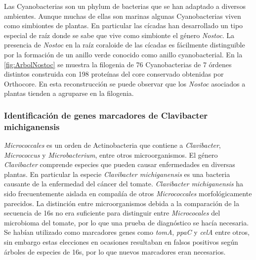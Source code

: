 \documentclass[]{article}
\begin{document}
Las Cyanobacterias son un phylum de bacterias que se han adaptado a
diversos ambientes. Aunque muchas de ellas son marinas algunas
Cyanobacterias viven como simbiontes de plantas. En particular las
cícadas han desarrollado un tipo especial de raíz donde se sabe que vive
como simbionte el género \emph{Nostoc}. La presencia de \emph{Nostoc} en
la raíz coraloide de las cícadas es fácilmente distinguible por la
formación de un anillo verde conocido como anillo cyanobacterial. En la
\autoref{fig:ArbolNostoc} se muestra la filogenia de 76 Cyanobacterias
de 7 órdenes distintos construida con 198 proteínas del core conservado
obtenidas por Orthocore. En esta reconstrucción se puede observar que
los \emph{Nostoc} asociados a plantas tienden a agruparse en la
filogenia.

\subsubsection{Identificación de genes marcadores de Clavibacter
michiganensis}\label{identificacion-de-genes-marcadores-de-clavibacter-michiganensis}

\emph{Micrococcales} es un orden de Actinobacteria que contiene a
\emph{Clavibacter}, \emph{Micrococcus} y \emph{Microbacterium}, entre
otros microorganismos. El género \emph{Clavibacter} comprende especies
que pueden causar enfermedades en diversas plantas. En particular la
especie \emph{Clavibacter michiganensis} es una bacteria causante de la
enfermedad del cáncer del tomate. \emph{Clavibacter michiganensis} ha
sido frecuentemente aislada en compañía de otros \emph{Micrococcales}
morfológicamente parecidos. La distinción entre microorganismos debida a
la comparación de la secuencia de 16s no era suficiente para distinguir
entre \emph{Micrococales} del microbioma del tomate, por lo que una
prueba de diagnóstico se hacía necesaria. Se habían utilizado como
marcadores genes como \emph{tomA}, \emph{ppaC} y \emph{celA} entre
otros, sin embargo estas elecciones en ocasiones resultaban en falsos
positivos según árboles de especies de 16s, por lo que nuevos marcadores
eran necesarios.
\end{document}
